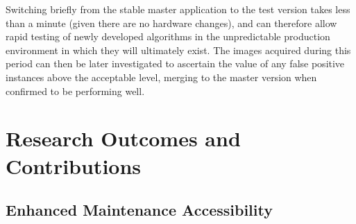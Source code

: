 \documentclass[fleqn,twoside,12pt]{report}
\begin{document}
Switching briefly from the stable master application to the test version takes less than a minute (given there are no hardware changes), and can therefore allow rapid testing of newly developed algorithms in the unpredictable production environment in which they will ultimately exist. The images acquired during this period can then be later investigated to ascertain the value of any false positive instances above the acceptable level, merging to the master version when confirmed to be performing well.



\section{Research Outcomes and Contributions}

\subsection{Enhanced Maintenance Accessibility}
\end{document}
